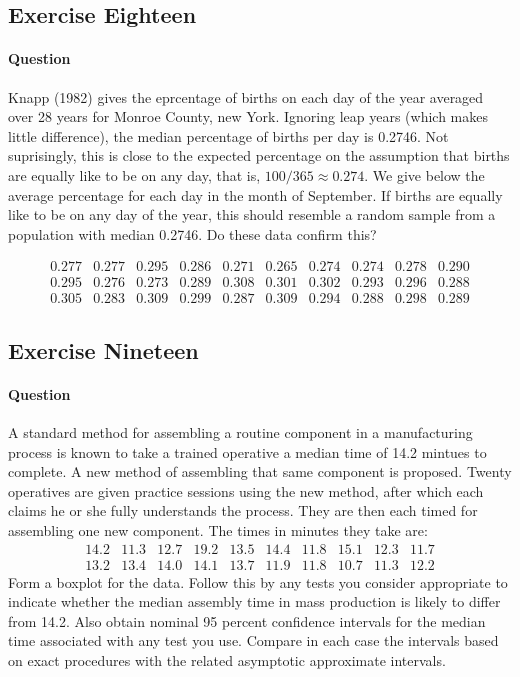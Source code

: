 \documentclass[]{article}
\let\oldparagraph\paragraph
\renewcommand{\paragraph}[1]{\oldparagraph{#1}\mbox{}}
\begin{document}
\subsection{Exercise Eighteen}\label{exercise-eighteen}

\paragraph{Question}\label{question-17}

Knapp (1982) gives the eprcentage of births on each day of the year
averaged over 28 years for Monroe County, new York. Ignoring leap years
(which makes little difference), the median percentage of births per day
is 0.2746. Not suprisingly, this is close to the expected percentage on
the assumption that births are equally like to be on any day, that is,
\(100/365 \approx 0.274\). We give below the average percentage for each
day in the month of September. If births are equally like to be on any
day of the year, this should resemble a random sample from a population
with median 0.2746. Do these data confirm this?

\[\begin{array}
{cccccccccc}
0.277 & 0.277 & 0.295 & 0.286 & 0.271 & 0.265 & 0.274 & 0.274 & 0.278 & 0.290\\
0.295 & 0.276 & 0.273 & 0.289 & 0.308 & 0.301 & 0.302 & 0.293 & 0.296 & 0.288\\
0.305 & 0.283 & 0.309 & 0.299 & 0.287 & 0.309 & 0.294 & 0.288 & 0.298 & 0.289
\end{array}
\]

\subsection{Exercise Nineteen}\label{exercise-nineteen}

\paragraph{Question}\label{question-18}

A standard method for assembling a routine component in a manufacturing
process is known to take a trained operative a median time of 14.2
mintues to complete. A new method of assembling that same component is
proposed. Twenty operatives are given practice sessions using the new
method, after which each claims he or she fully understands the process.
They are then each timed for assembling one new component. The times in
minutes they take are: \[\begin{array}
{cccccccccc}
14.2 & 11.3 & 12.7 & 19.2 & 13.5 & 14.4 & 11.8 & 15.1 & 12.3 & 11.7\\
13.2 & 13.4 & 14.0 & 14.1 & 13.7 & 11.9 & 11.8 & 10.7 & 11.3 & 12.2
\end{array}
\] Form a boxplot for the data. Follow this by any tests you consider
appropriate to indicate whether the median assembly time in mass
production is likely to differ from 14.2. Also obtain nominal 95 percent
confidence intervals for the median time associated with any test you
use. Compare in each case the intervals based on exact procedures with
the related asymptotic approximate intervals.
\end{document}
